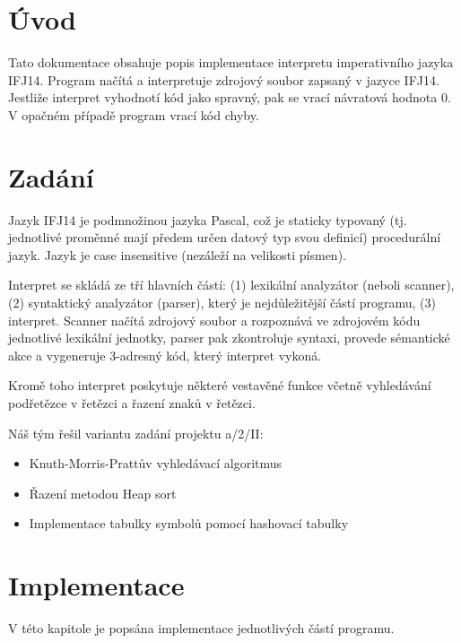 \documentclass[12pt,a4paper,titlepage,final]{report}
\begin{document}
\pagestyle{plain}
\setcounter{page}{1}
{\hypersetup{linkcolor=black}
\tableofcontents
}

\newpage
\pagestyle{plain}
\setcounter{page}{1}


\chapter{Úvod} \label{uvod}
Tato dokumentace obsahuje popis implementace interpretu imperativního jazyka IFJ14. Program načítá a interpretuje zdrojový soubor zapsaný v jazyce IFJ14. Jestliže interpret vyhodnotí kód jako spravný, pak se vrací návratová hodnota 0. V opačném případě program vrací kód chyby.

\chapter{Zadání} \label{zadani}
Jazyk IFJ14 je podmnožinou jazyka Pascal, což je staticky typovaný (tj. jednotlivé proměnné mají předem určen datový typ svou definicí) procedurální jazyk. Jazyk je case insensitive (nezáleží na velikosti písmen).

Interpret se skládá ze tří hlavních částí: (1) lexikální analyzátor (neboli scanner), (2) syntaktický analyzátor (parser), který je nejdůležitější částí programu, (3) interpret. Scanner načítá zdrojový soubor a rozpoznává ve zdrojovém kódu jednotlivé lexikální jednotky, parser pak zkontroluje syntaxi, provede sémantické akce a vygeneruje 3-adresný kód, který interpret vykoná.

Kromě toho interpret poskytuje některé vestavěné funkce včetně vyhledávání podřetězce v řetězci a řazení znaků v řetězci.

Náš tým řešil variantu zadání projektu a/2/II:
\begin{itemize}
\item Knuth-Morris-Prattův vyhledávací algoritmus
\item Řazení metodou Heap sort
\item Implementace tabulky symbolů pomocí hashovací tabulky
\end{itemize}

\chapter{Implementace} \label{implementace}
V této kapitole je popsána implementace jednotlivých částí programu.
\end{document}
